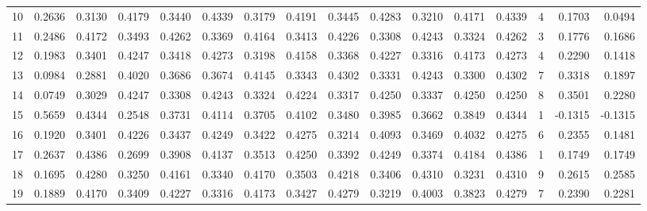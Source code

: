 \begin{tabular}{lrrrrrrrrrrrrrrr}
10 &      0.2636 &  0.3130 &  0.4179 &  0.3440 &  0.4339 &  0.3179 &  0.4191 &  0.3445 &  0.4283 &  0.3210 &   0.4171 &     0.4339 &      4 &                    0.1703 &                     0.0494 \\
11 &      0.2486 &  0.4172 &  0.3493 &  0.4262 &  0.3369 &  0.4164 &  0.3413 &  0.4226 &  0.3308 &  0.4243 &   0.3324 &     0.4262 &      3 &                    0.1776 &                     0.1686 \\
12 &      0.1983 &  0.3401 &  0.4247 &  0.3418 &  0.4273 &  0.3198 &  0.4158 &  0.3368 &  0.4227 &  0.3316 &   0.4173 &     0.4273 &      4 &                    0.2290 &                     0.1418 \\
13 &      0.0984 &  0.2881 &  0.4020 &  0.3686 &  0.3674 &  0.4145 &  0.3343 &  0.4302 &  0.3331 &  0.4243 &   0.3300 &     0.4302 &      7 &                    0.3318 &                     0.1897 \\
14 &      0.0749 &  0.3029 &  0.4247 &  0.3308 &  0.4243 &  0.3324 &  0.4224 &  0.3317 &  0.4250 &  0.3337 &   0.4250 &     0.4250 &      8 &                    0.3501 &                     0.2280 \\
15 &      0.5659 &  0.4344 &  0.2548 &  0.3731 &  0.4114 &  0.3705 &  0.4102 &  0.3480 &  0.3985 &  0.3662 &   0.3849 &     0.4344 &      1 &                   -0.1315 &                    -0.1315 \\
16 &      0.1920 &  0.3401 &  0.4226 &  0.3437 &  0.4249 &  0.3422 &  0.4275 &  0.3214 &  0.4093 &  0.3469 &   0.4032 &     0.4275 &      6 &                    0.2355 &                     0.1481 \\
17 &      0.2637 &  0.4386 &  0.2699 &  0.3908 &  0.4137 &  0.3513 &  0.4250 &  0.3392 &  0.4249 &  0.3374 &   0.4184 &     0.4386 &      1 &                    0.1749 &                     0.1749 \\
18 &      0.1695 &  0.4280 &  0.3250 &  0.4161 &  0.3340 &  0.4170 &  0.3503 &  0.4218 &  0.3406 &  0.4310 &   0.3231 &     0.4310 &      9 &                    0.2615 &                     0.2585 \\
19 &      0.1889 &  0.4170 &  0.3409 &  0.4227 &  0.3316 &  0.4173 &  0.3427 &  0.4279 &  0.3219 &  0.4003 &   0.3823 &     0.4279 &      7 &                    0.2390 &                     0.2281 \\
\bottomrule
\end{tabular}
